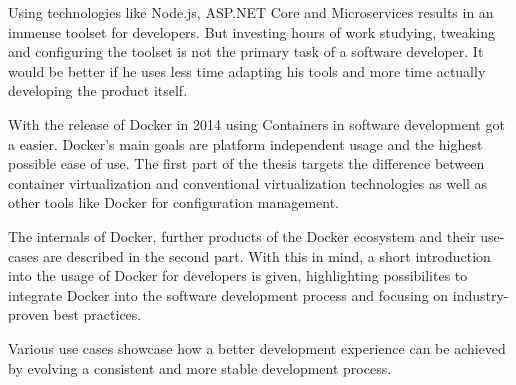 Using technologies like Node.js, ASP.NET Core and Microservices results in an immense toolset for developers.
But investing hours of work studying, tweaking and configuring the toolset is not the primary task of a software developer.
It would be better if he uses less time adapting his tools and more time actually developing the product itself.

With the release of Docker in 2014 using Containers in software development got a easier. Docker's main goals are platform independent usage and the highest possible ease of use.
The first part of the thesis targets the difference between container virtualization and conventional virtualization technologies as well as other tools like Docker for configuration management.

The internals of Docker, further products of the Docker ecosystem and their use-cases are described in the second part.
With this in mind, a short introduction into the usage of Docker for developers is given, highlighting possibilites to integrate Docker into the software development process and focusing on industry-proven best practices.

Various use cases showcase how a better development experience can be achieved by evolving a consistent and more stable development process. 
